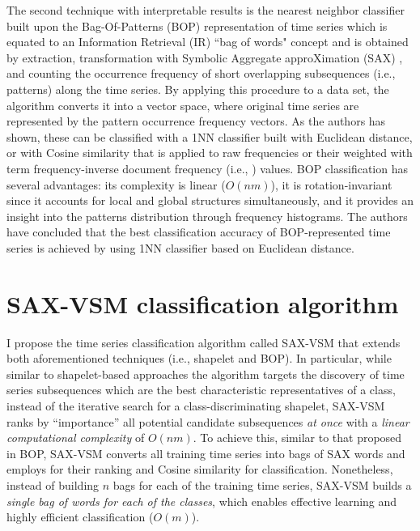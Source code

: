 The second technique with interpretable results is the nearest neighbor classifier built upon the Bag-Of-Patterns (BOP) representation of 
time series \cite{citeulike:10525778} which is equated to an Information Retrieval (IR) ``bag of words" concept and is obtained by extraction, 
transformation with Symbolic Aggregate approXimation (SAX) \cite{sax}, and counting the occurrence frequency of short overlapping 
subsequences (i.e., patterns) along the time series.
By applying this procedure to a data set, the algorithm converts it into a vector space, where original time series are 
represented by the pattern occurrence frequency vectors. As the authors has shown, these can be classified with a 1NN classifier 
built with Euclidean distance, or with Cosine similarity that is applied to raw frequencies or their weighted with 
term frequency-inverse document frequency (i.e., \tfidf \cite{salton-71}) values. 
BOP classification has several advantages: its complexity is linear ($O(nm)$), it is rotation-invariant since it accounts for local and 
global structures simultaneously, and it provides an insight into the patterns distribution through frequency histograms.
The authors have concluded that the best classification accuracy of BOP-represented time series is achieved by using 1NN classifier 
based on Euclidean distance. 

\section{SAX-VSM classification algorithm} \label{sax_vsm_background}
I propose the time series classification algorithm called \mbox{SAX-VSM} that extends both aforementioned techniques (i.e., shapelet and BOP). 
In particular, while similar to shapelet-based approaches the algorithm targets the discovery of time series subsequences which 
are the best characteristic representatives of a class, 
instead of the iterative search for a class-discriminating shapelet, \mbox{SAX-VSM} ranks by “importance” all potential candidate 
subsequences \textit{at once} with a \textit{linear computational complexity} of $O(nm)$.
To achieve this, similar to that proposed in BOP, \mbox{SAX-VSM} converts all training time series into bags of SAX 
words and employs \tfidf for their ranking and Cosine similarity for classification. 
Nonetheless, instead of building $n$ bags for each of the training time series, SAX-VSM builds a 
\textit{single bag of words for each of the classes}, which enables effective learning and highly efficient classification ($O(m)$).

